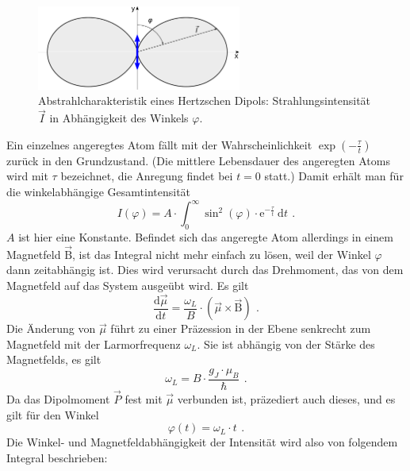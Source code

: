 \begin{figure}[H]
\begin{center}
  \includegraphics[width=0.6\textwidth]{../img/dipol.pdf}
  \caption{Abstrahlcharakteristik eines Hertzschen Dipols: Strahlungsintensität $\vec{I}$ in Abhängigkeit des
  Winkels $\varphi$.}
  \label{img:dipol}
\end{center}
\end{figure}

Ein einzelnes angeregtes Atom fällt mit der Wahrscheinlichkeit $\exp(-\frac{\tau}{t})$ zurück in den Grundzustand.
(Die mittlere Lebensdauer des angeregten Atoms wird mit $\tau$ bezeichnet, die Anregung findet bei $t = 0$ statt.)
Damit erhält man für die winkelabhängige Gesamtintensität
\begin{equation}
\label{eq:int}
I(\varphi) = A \cdot \int_0^{\infty} \sin^2(\varphi) \cdot \text{e}^{-\frac{\tau}{t}} \ \text{d}t \, \ .
\end{equation}
$A$ ist hier eine Konstante. Befindet sich das angeregte Atom allerdings in einem Magnetfeld $\vec{\text{B}}$,
ist das Integral nicht mehr einfach zu lösen, weil der Winkel $\varphi$ dann zeitabhängig ist.
Dies wird verursacht durch das Drehmoment, das von dem Magnetfeld auf das System ausgeübt wird.
Es gilt
\begin{equation}
\label{eq:dmu}
\frac{\text{d}\vec{\mu}}{\text{d}t} = \frac{\omega_L}{B} \cdot (\vec{\mu} \times \vec{\text{B}}) \ \, .
\end{equation}
Die Änderung von $\vec{\mu}$  führt zu einer Präzession in der Ebene senkrecht zum Magnetfeld
mit der Larmorfrequenz $\omega_L$.
Sie ist abhängig von der Stärke des Magnetfelds, es gilt
\begin{equation}
\label{eq:larmorfreq}
\omega_L = B \cdot \frac{g_J \cdot \mu_B}{\hbar} \ \, .
\end{equation}
Da das Dipolmoment $\vec{P}$ fest mit $\vec{\mu}$ verbunden ist, präzediert auch dieses, und es gilt für den
Winkel
\begin{equation}
\label{eq:phit}
\varphi(t) = \omega_L \cdot t \ \, .
\end{equation}
Die Winkel- und Magnetfeldabhängigkeit der Intensität wird also von folgendem Integral beschrieben:
